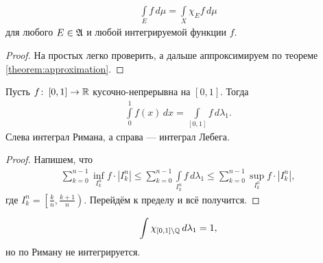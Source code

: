 \begin{remrk}
 \begin{align*}
  \int\limits_E f\,d\mu = \int\limits_X \chi_E f \,d\mu
 \end{align*} для любого $E \in \mathfrak{A}$ и любой интегрируемой функции $f$.
\end{remrk}
\begin{proof}
 На простых легко проверить, а дальше аппроксимируем по теореме \ref{theorem:approximation}.
\end{proof}
\begin{claim}
 Пусть $f \colon\, [0,1] \to \mathbb{R}  $ кусочно-непрерывна на $[0,1]$. Тогда \begin{align*}
  \int\limits_{0}^{1} f(x) \, dx = \int\limits_{[0,1]} f \, d\lambda_1
 .\end{align*}  Слева интеграл Римана, а справа --- интеграл Лебега.
\end{claim}
\begin{proof}
 Напишем, что \begin{align*}
  \sum_{k=0}^{n - 1} \inf_{I_k^{n}} f \cdot \left| I_k^{n} \right| \leqslant \sum_{k=0}^{n - 1} \int\limits_{I_k^{n}} f \, d\lambda_1 \leqslant \sum_{k=0}^{n - 1} \sup_{I_k^{n}} f \cdot \left| I_k^{n} \right|
 ,\end{align*}  где $I_k^{n} = \left[ \frac{k}{n}, \frac{k+1}{n} \right)$. Перейдём к пределу и всё получится.
\end{proof}
\begin{remrk}
 \begin{align*}
  \int\limits \chi_{[0,1] \setminus \mathbb{Q}} \, d\lambda_1 = 1
 ,\end{align*} но по Риману не интегрируется.
\end{remrk}

